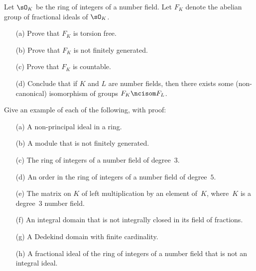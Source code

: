 \begin{exercise}
  Let $\sO_K$ be the ring of integers of a number field.
  Let $F_K$ denote the abelian group of fractional ideals of $\sO_K$.
  \begin{enumerate}
    \item[(a)] Prove that $F_K$ is torsion free.
    \item[(b)] Prove that $F_K$ is not finitely generated.
    \item[(c)] Prove that $F_K$ is countable.
    \item[(d)] Conclude that if $K$ and $L$ are number fields, then there
    exists some (non-canonical) isomorphism of groups $F_K\ncisom F_L$.
  \end{enumerate}
\end{exercise}

\begin{exercise}
  Give an example of each of the following, with proof:
  \begin{enumerate}
    \item[(a)] A non-principal ideal in a ring.
    \item[(b)] A module that is not finitely generated.
    \item[(c)] The ring of integers of a number field of degree~$3$.
    \item[(d)] An order in the ring of integers of a number field of degree~$5$.
    \item[(e)] The matrix on $K$ of left multiplication by an element of~$K$,
    where~$K$ is a degree~$3$ number field.
    \item[(f)] An integral domain that is not integrally closed in its field
    of fractions.
    \item[(g)] A Dedekind domain with finite cardinality.
    \item[(h)] A fractional ideal of the ring of integers of a number
    field that is not an integral ideal.
  \end{enumerate}
\end{exercise}
